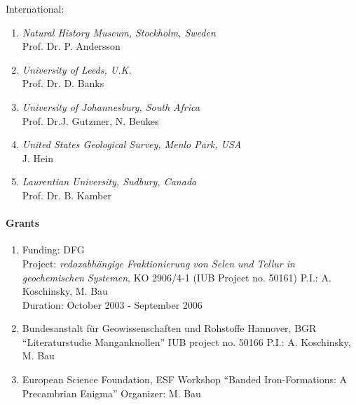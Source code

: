 International:
\begin{enumerate}
\item {\sl Natural History Museum, Stockholm, Sweden} \\Prof. Dr. P. Andersson
\item {\sl University of Leeds, U.K.}\\Prof. Dr. D. Banks
\item {\sl University of Johannesburg, South Africa}\\ Prof. Dr.J. Gutzmer,
N. Beukes
\item {\sl United States Geological Survey, Menlo Park, USA}\\ J. Hein
\item {\sl Laurentian University, Sudbury, Canada}\\Prof. Dr. B. Kamber
\end{enumerate}


\paragraph{Grants}
\begin{enumerate}
\item Funding:  DFG \\
Project: \emph{redoxabh\"angige Fraktionierung von Selen und Tellur
in geochemischen Systemen},  KO 2906/4-1 (IUB Project no. 50161)
P.I.: A. Koschinsky, M. Bau \\
Duration: October 2003 - September 2006

\item {Bundesanstalt f\"ur Geowissenschaften und Rohstoffe Hannover,
BGR} ``Literaturstudie Manganknollen'' IUB project no. 50166 P.I.:
A. Koschinsky, M. Bau


\item {European Science Foundation, ESF} Workshop ``Banded
Iron-Formations: A Precambrian Enigma'' Organizer: M. Bau
\end{enumerate}

\nocite{Bau1,Bau2,Bau3}
